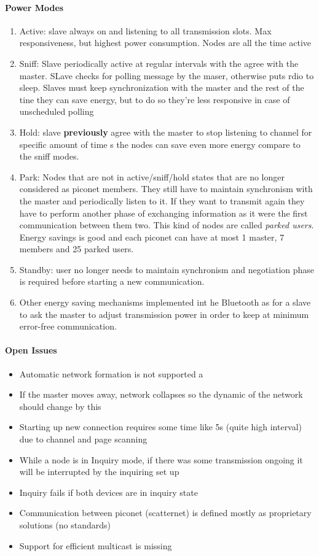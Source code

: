 \paragraph{Power Modes}
\begin{enumerate}
\item Active: slave always on and listening to all transmission slots. Max responsiveness, but highest power consumption. Nodes are all the time active
\item Sniff: Slave periodically active at regular intervals with the agree with the master. SLave checks for polling message by the maser, otherwise puts rdio to sleep. Slaves must keep synchronization with the master and the rest of the tine they can save energy, but to do so they're less responsive in case of unscheduled polling
\item Hold: slave \textbf{previously} agree with the master to stop listening to channel for specific amount of time  s the nodes can save even more energy compare to the sniff modes.
\item Park: Nodes that are not in active/sniff/hold states that are no longer considered as piconet members. They still have to maintain synchronism with the master and periodically listen to it. If they want to transmit again they have to perform another phase of exchanging information as it were the first communication between them two. This kind of nodes are called \emph{parked users}. Energy savings is good and each piconet can have at most 1 master, 7 members and 25 parked users.
\item Standby: user no longer needs to maintain synchronism and negotiation phase is required before starting a new communication.
\item Other energy saving mechanisms implemented int he Bluetooth as for a slave to ask the master to adjust transmission power in order to keep at minimum error-free communication.
\end{enumerate}

\paragraph{Open Issues}
\begin{itemize}
\item Automatic network formation is not supported a
\item If the master moves away, network collapses so  the dynamic of the network should change by this
\item Starting up new connection requires some time like 5s (quite high interval) due to channel and page scanning
\item While a node is in Inquiry mode, if there was some transmission ongoing it will be interrupted by the inquiring set up
\item Inquiry fails if both devices are in inquiry state
\item Communication between piconet (scatternet) is defined mostly as proprietary solutions (no standards)
\item Support for efficient multicast is missing
\end{itemize}

